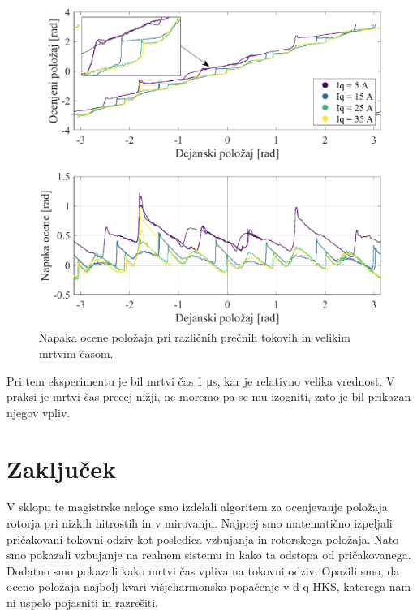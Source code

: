 \documentclass[a4paper,twoside,openright,12pt,slovene]{book}
\begin{document}
\begin{figure}[!htbp]
    \centering
    \includegraphics[width=1.05\columnwidth]{Slike/vsiljenaPozicijaTokoviZMrtvimCasom_angleError.eps}
    \caption{\label{vsiljenaPozicijaTokoviZMrtvimCasom_angleError} Napaka ocene položaja pri različnih prečnih tokovih in velikim mrtvim časom. }
\end{figure}

Pri tem eksperimentu je bil mrtvi čas 1 μs, kar je relativno velika vrednost. V praksi je mrtvi čas precej nižji, ne moremo pa se mu izogniti, zato je bil prikazan njegov vpliv.

\chapter{Zaključek} \label{zakljucek}

V sklopu te magistrske neloge smo izdelali algoritem za ocenjevanje položaja rotorja pri nizkih hitrostih in v mirovanju. Najprej smo matematično izpeljali pričakovani tokovni odziv kot posledica
vzbujanja in rotorskega položaja. Nato smo pokazali vzbujanje na realnem sistemu in kako ta odstopa od pričakovanega. Dodatno smo pokazali kako mrtvi čas vpliva na tokovni odziv. Opazili smo, da oceno
položaja najbolj kvari višjeharmonsko popačenje v d-q HKS, katerega nam ni uspelo pojasniti in razrešiti. 
\end{document}
